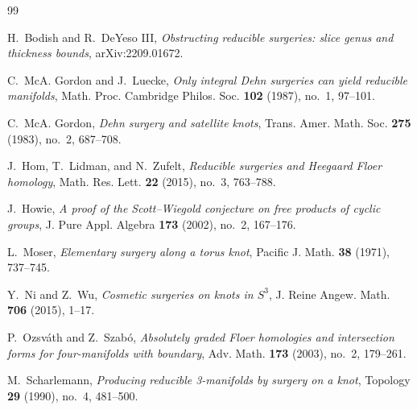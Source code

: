 \documentclass[11pt]{article}
\begin{document}
\begin{thebibliography}{99}

H.~Bodish and R.~DeYeso III,
\emph{Obstructing reducible surgeries: slice genus and thickness bounds},
arXiv:2209.01672.

C.~McA. Gordon and J.~Luecke,
\emph{Only integral Dehn surgeries can yield reducible manifolds},
Math. Proc. Cambridge Philos. Soc. \textbf{102} (1987), no.~1, 97--101.

C.~McA. Gordon,
\emph{Dehn surgery and satellite knots},
Trans. Amer. Math. Soc. \textbf{275} (1983), no.~2, 687--708.

J.~Hom, T.~Lidman, and N.~Zufelt,
\emph{Reducible surgeries and Heegaard Floer homology},
Math. Res. Lett. \textbf{22} (2015), no.~3, 763--788.

J.~Howie,
\emph{A proof of the Scott--Wiegold conjecture on free products of cyclic groups},
J. Pure Appl. Algebra \textbf{173} (2002), no.~2, 167--176.

L.~Moser,
\emph{Elementary surgery along a torus knot},
Pacific J. Math. \textbf{38} (1971), 737--745.

Y.~Ni and Z.~Wu,
\emph{Cosmetic surgeries on knots in \(S^{3}\)},
J. Reine Angew. Math. \textbf{706} (2015), 1--17.

P.~Ozsv\'ath and Z.~Szab\'o,
\emph{Absolutely graded Floer homologies and intersection forms for four-manifolds with boundary},
Adv. Math. \textbf{173} (2003), no.~2, 179--261.

M.~Scharlemann,
\emph{Producing reducible 3-manifolds by surgery on a knot},
Topology \textbf{29} (1990), no.~4, 481--500.

\end{thebibliography}
\end{document}

